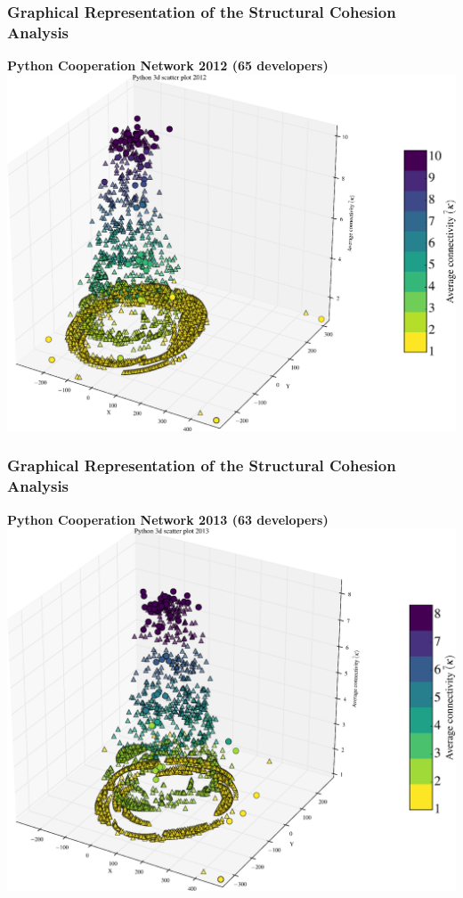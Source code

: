 \documentclass[ignorenonframetext,red,8pt,notes=hide]{beamer}
\begin{document}
\begin{frame}
\frametitle{Graphical Representation of the Structural Cohesion Analysis}

\begin{center}
\textbf{Python Cooperation Network 2012 (65 developers)}
\includegraphics[scale=0.25]{img/3d_scatter_python_2012}
\end{center}

\end{frame}


\begin{frame}
\frametitle{Graphical Representation of the Structural Cohesion Analysis}

\begin{center}
\textbf{Python Cooperation Network 2013 (63 developers)}
\includegraphics[scale=0.25]{img/3d_scatter_python_2013}
\end{center}

\end{frame}
\end{document}
